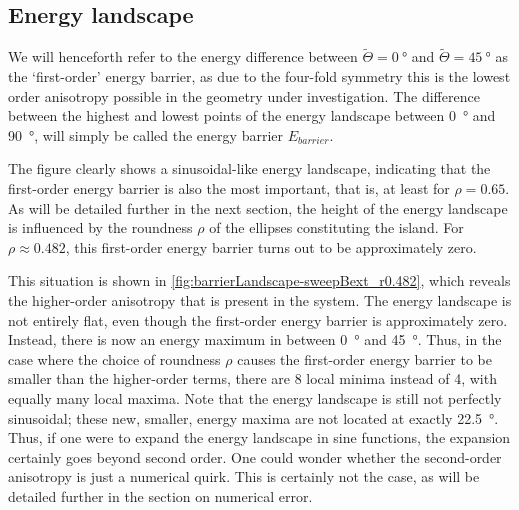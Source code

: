 \documentclass[11pt,a4paper,english]{article}
\begin{document}
\subsection{Energy landscape}
We will henceforth refer to the energy difference between $\widetilde{\Theta} = \SI{0}{\degree}$ and $\widetilde{\Theta} = \SI{45}{\degree}$ as the `first-order' energy barrier, as due to the four-fold symmetry this is the lowest order anisotropy possible in the geometry under investigation. The difference between the highest and lowest points of the energy landscape between \SI{0}{\degree} and \SI{90}{\degree}, will simply be called the energy barrier $E_{barrier}$. \par
The figure clearly shows a sinusoidal-like energy landscape, indicating that the first-order energy barrier is also the most important, that is, at least for $\rho=0.65$. As will be detailed further in the next section, the height of the energy landscape is influenced by the roundness $\rho$ of the ellipses constituting the island. For $\rho \approx 0.482$, this first-order energy barrier turns out to be approximately zero. \par
This situation is shown in \cref{fig:barrierLandscape-sweepBext_r0.482}, which reveals the higher-order anisotropy that is present in the system. The energy landscape is not entirely flat, even though the first-order energy barrier is approximately zero. Instead, there is now an energy maximum in between \SI{0}{\degree} and \SI{45}{\degree}. Thus, in the case where the choice of roundness $\rho$ causes the first-order energy barrier to be smaller than the higher-order terms, there are 8 local minima instead of 4, with equally many local maxima. Note that the energy landscape is still not perfectly sinusoidal; these new, smaller, energy maxima are not located at exactly \SI{22.5}{\degree}. Thus, if one were to expand the energy landscape in sine functions, the expansion certainly goes beyond second order. One could wonder whether the second-order anisotropy is just a numerical quirk. This is certainly not the case, as will be detailed further in the section on numerical error.
\end{document}
